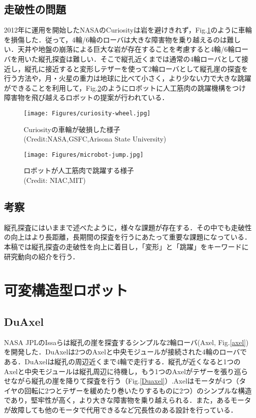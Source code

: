 \documentclass[a4paper,11pt,dvipdfmx.uplatex]{jsarticle}
\begin{document}
\subsection{走破性の問題}
2012年に運用を開始したNASAのCuriosityは岩を避けきれず，Fig.\ref{hason}のように車輪を損傷した\cite{Pflueger}．従って，4輪/6輪のローバは大きな障害物を乗り越えるのは難しい．天井や地盤の崩落による巨大な岩が存在することを考慮すると4輪/6輪ローバを用いた縦孔探査は難しい．そこで縦孔近くまでは通常の4輪ローバとして接近し，縦孔に接近すると変形しテザーを使って2輪ローバとして縦孔崖の探査を行う方法\cite{DuAxel}や，月・火星の重力は地球に比べて小さく，より少ない力で大きな跳躍ができることを利用して，Fig.\ref{microbot}のようにロボットに人工筋肉の跳躍機構をつけ障害物を飛び越えるロボットの提案\cite{microbots}が行われている．

\begin{figure}[htbp]
\centering
  \texttt{[image: Figures/curiosity-wheel.jpg]}
  \caption{Curiosityの車輪が破損した様子\cite{Pflueger}\\(Credit:NASA,GSFC,Arisona State University)}
  \label{hason}
\end{figure}


    \begin{figure}[htbp]
\centering
  \texttt{[image: Figures/microbot-jump.jpg]}
  \caption{ロボットが人工筋肉で跳躍する様子\cite{DF}\\(Credit: NIAC,MIT)}
  \label{microbot}
\end{figure}



\subsection{考察}
縦孔探査にはいままで述べたように，様々な課題が存在する．その中でも走破性の向上はより長距離，長期間の探査を行うにあたって重要な課題になっている．本稿では縦孔探査の走破性を向上に着目し，「変形」と「跳躍」をキーワードに研究動向の紹介を行う．

\section{可変構造型ロボット}
\subsection{\bf DuAxel}
NASA JPLのIssaらは縦孔の崖を探査するシンプルな2輪ローバ(Axel, Fig.\ref{axel}) を開発した\cite{Axel}．DuAxelは2つのAxelと中央モジュールが接続された4輪のローバである\cite{DuAxel}．DuAxelは縦孔の周辺近くまで4輪で走行する．縦孔が近くなると1つのAxelと中央モジュールは縦孔周辺に待機し，もう1つのAxelがテザーを張り巡らせながら縦孔の崖を降りて探査を行う（Fig.\ref{Duaxel}）.Axelはモータが4つ（タイヤの回転に2つとテザーを緩めたり巻いたりするものに2つ）のシンプルな構造であり，堅牢性が高く，より大きな障害物を乗り越えられる．また，あるモータが故障しても他のモータで代用できるなど冗長性のある設計を行っている．
\end{document}
